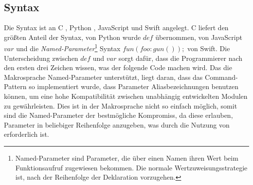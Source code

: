   \subsection{Syntax}
  \label{ssec:Syntax}
    Die Syntax ist an C \autocite{C-std}, Python \autocite{Python-std}, JavaScript \autocite{Ecma-std} und Swift \autocite{Swift-std} angelegt. C liefert den größten Anteil der Syntax, von Python wurde \myMIn$def$ übernommen, von JavaScript \myMIn$var$ und die \emph{Named-Parameter}\footnote{
      Named-Parameter sind Parameter, die über einen Namen ihren Wert beim Funktionsaufruf zugewiesen bekommen. Die normale Wertzuweisungsstrategie ist, nach der Reihenfolge der Deklaration vorzugehen.
    }
    Syntax \myMIn$fun(foo:gun());$ von Swift. Die Unterscheidung zwischen \myMIn$def$ und \myMIn$var$ sorgt dafür, dass die Programmierer nach den ersten drei Zeichen wissen, was der folgende Code machen wird. Das die Makrosprache Named-Parameter unterstützt, liegt daran, dass das Command-Pattern so implementiert wurde, dass Parameter Aliasbezeichnungen benutzen können, um eine hohe Kompatibilität zwischen unabhängig entwickelten Modulen zu gewährleisten. Dies ist in der Makrosprache nicht so einfach möglich, somit sind die Named-Parameter der bestmögliche Kompromiss, da diese erlauben, Parameter in beliebiger Reihenfolge anzugeben, was durch die Nutzung von  erforderlich ist.


